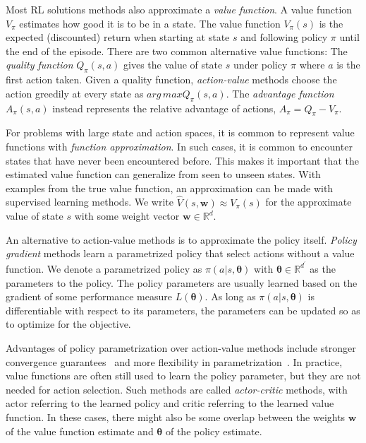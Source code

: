 Most RL solutions methods also approximate a \textit{value function}.
A value function \(V_\pi\) estimates how good it is to be in a state.
The value function \(V_\pi(s)\) is the expected (discounted) return when starting at state \(s\) and following policy \(\pi\) until the end of the episode.
There are two common alternative value functions:
The \textit{quality function} \(Q_\pi(s,a)\) gives the value of state \(s\) under policy \(\pi\) where \(a\) is the first action taken.
Given a quality function, \textit{action-value} methods choose the action greedily at every state as \(arg\,max Q_\pi(s, a)\).
The \textit{advantage function} \(A_\pi(s, a)\) instead represents the relative advantage of actions, \(A_\pi = Q_\pi - V_\pi\).~\cite{sutton_reinforcement_2018}

For problems with large state and action spaces, it is common to represent value functions with \textit{function approximation}.
In such cases, it is common to encounter states that have never been encountered before.
This makes it important that the estimated value function can generalize from seen to unseen states.
With examples from the true value function, an approximation can be made with supervised learning methods.
We write \(\hat{V}(s,\mathbf{w}) \approx V_\pi(s)\) for the approximate value of state \(s\) with some weight vector \(\mathbf{w} \in \mathbb{R}^d\).~\cite{sutton_reinforcement_2018}

An alternative to action-value methods is to approximate the policy itself.
\textit{Policy gradient} methods learn a parametrized policy that select actions without a value function.
We denote a parametrized policy as \(\pi(a|s,\boldsymbol{\theta})\) with \(\boldsymbol{\theta} \in \mathbb{R}^{d^\prime}\) as the parameters to the policy.
The policy parameters are usually learned based on the gradient of some performance measure \(L(\boldsymbol{\theta})\).
As long as \(\pi(a|s,\boldsymbol{\theta})\) is differentiable with respect to its parameters, the parameters can be updated so as to optimize for the objective.~\cite{sutton_policygrad_1999}

Advantages of policy parametrization over action-value methods include stronger convergence guarantees~\cite{sutton_policygrad_1999} and more flexibility in parametrization~\cite{sutton_reinforcement_2018}.
In practice, value functions are often still used to learn the policy parameter, but they are not needed for action selection.
Such methods are called \textit{actor-critic} methods, with actor referring to the learned policy and critic referring to the learned value function.
In these cases, there might also be some overlap between the weights \(\mathbf{w}\) of the value function estimate and \(\boldsymbol{\theta}\) of the policy estimate. 

